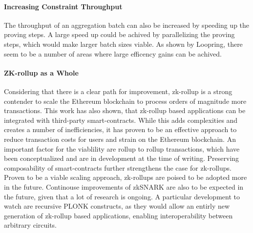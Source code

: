\documentclass[../../thesis.tex]{subfiles}
\begin{document}
\paragraph{Increasing Constraint Throughput}
The throughput of an aggregation batch can also be increased by speeding up the proving steps. A large speed up could be achived by parallelizing the proving steps, which would make larger batch sizes viable. As shown by Loopring, there seem to be a number of areas where large efficency gains can be achived. 

\paragraph{ZK-rollup as a Whole}
Considering that there is a clear path for improvement, zk-rollup is a strong contender to scale the Ethereum blockchain to process orders of magnitude more transactions. This work has also shown, that zk-rollup based applications can be integrated with third-party smart-contracts. While this adds complexities and creates a number of inefficiencies, it has proven to be an effective approach to reduce transaction costs for users and strain on the Ethereum blockchain. An important factor for the viablility are rollup to rollup transactions, which have been conceptualized and are in development at the time of writing. Preserving composability of smart-contracts further strengthens the case for zk-rollups. Proven to be a viable scaling approach, zk-rollups are poised to be adopted more in the future. Continouse improvements of zkSNARK are also to be expected in the future, given that a lot of research is ongoing. A particular development to watch are recursive PLONK constructs, as they would allow an entirly new generation of zk-rollup based applications, enabling interoperability between arbitrary circuits. 










\end{document}
